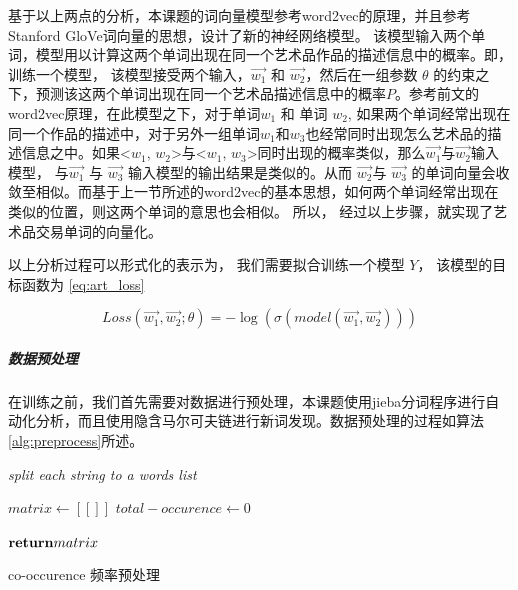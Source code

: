 基于以上两点的分析，本课题的词向量模型参考word2vec的原理，并且参考Stanford GloVe词向量的思想，设计了新的神经网络模型。 该模型输入两个单词，模型用以计算这两个单词出现在同一个艺术品作品的描述信息中的概率。即，训练一个模型， 该模型接受两个输入，$\vec{w_1}$ 和 $\vec{w_2}$，然后在一组参数 $\theta $ 的约束之下，预测该这两个单词出现在同一个艺术品描述信息中的概率$P$。参考前文的word2vec原理，在此模型之下，对于单词$w_1$ 和 单词 $w_2$, 如果两个单词经常出现在同一个作品的描述中，对于另外一组单词$w_1$和$w_3$也经常同时出现怎么艺术品的描述信息之中。如果<$w_1$, $w_2$>与<$w_1$, $w_3$>同时出现的概率类似，那么$\vec{w_1}$与$\vec{w_2}$输入模型， 与$\vec{w_1}$ 与 $\vec{w_3}$ 输入模型的输出结果是类似的。从而 $\vec{w_2}$与 $\vec{w_3}$ 的单词向量会收敛至相似。而基于上一节所述的word2vec的基本思想，如何两个单词经常出现在类似的位置，则这两个单词的意思也会相似。 所以， 经过以上步骤，就实现了艺术品交易单词的向量化。 

以上分析过程可以形式化的表示为， 我们需要拟合训练一个模型 $Y$， 该模型的目标函数为 \ref{eq:art_loss} 

\begin{equation}\label{eq:art_loss}
Loss(\vec{w_1}, \vec{w_2}; \theta) = -\log(\sigma(model(\vec{w_1}, \vec{w_2})))
\end{equation}

\subparagraph{数据预处理} 在训练之前，我们首先需要对数据进行预处理，本课题使用jieba分词程序进行自动化分析，而且使用隐含马尔可夫链进行新词发现。数据预处理的过程如算法 \ref{alg:preprocess}所述。 

\begin{algorithm}


\BlankLine
\emph{split each string to a words list}

$matrix\leftarrow [[]] $\;
$total-occurence \leftarrow 0$ \;



$\Return matrix$ \;

\caption{co-occurence 频率预处理}\label{alg:preprocess}
\end{algorithm}

